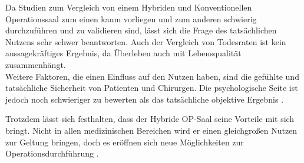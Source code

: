 Da Studien zum Vergleich von einem Hybriden und Konventionellen Operationssaal zum einen kaum vorliegen und zum anderen schwierig durchzuführen und zu validieren sind, lässt sich die Frage des tatsächlichen Nutzens sehr schwer beantworten. Auch der Vergleich von Todesraten ist kein aussagekräftiges Ergebnis, da Überleben auch mit Lebensqualität zusammenhängt\cite{HybriderVsKonventioneller}. \\
Weitere Faktoren, die einen Einfluss auf den Nutzen haben, sind die gefühlte und tatsächliche Sicherheit von Patienten und Chirurgen. Die psychologische Seite ist jedoch noch schwieriger zu bewerten als das tatsächliche objektive Ergebnis \cite{DerDigitaleOperationssaal}.

Trotzdem lässt sich festhalten, dass der Hybride OP-Saal seine Vorteile mit sich bringt. Nicht in allen medizinischen Bereichen wird er einen gleichgroßen Nutzen zur Geltung bringen, doch es eröffnen sich neue Möglichkeiten zur Operationsdurchführung \cite{ORofTheFuture}.





 






